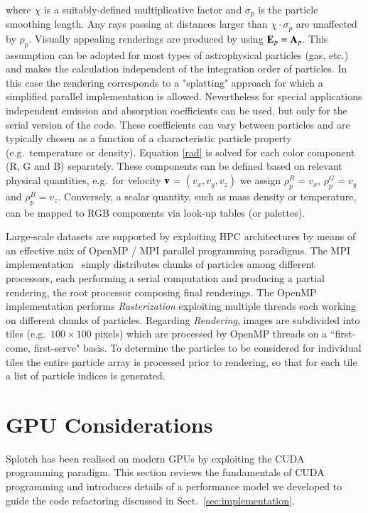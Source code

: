 \documentclass[preprint,5pt]{elsarticle}
\begin{document}
\begin{itemize}
where $\chi$ is a suitably-defined multiplicative factor and $\sigma_p$ is the particle smoothing length. Any rays passing at distances larger than $\chi\cdot\sigma_p$ are unaffected by $\rho_p$. 
Visually appealing renderings are produced by using ${\bf E}_p = {\bf A}_p$. 
This assumption can be adopted for most types of astrophysical particles (gas, etc.) and makes the calculation independent of the integration order of particles. In this case the rendering corresponds to a "splatting" approach for which a simplified parallel implementation is allowed. Nevertheless for special applications independent emission and absorption coefficients can be used, but only for the serial version of the code. These coefficients
can vary between particles and are typically chosen as a function of a characteristic
particle property (e.g.\ temperature or density).
Equation \eqref{rad} is solved for each color component (R, G and B) separately. These components can be defined based on relevant physical quantities, e.g.\ for velocity $\bf v$$=(v_x, v_y, v_z)$ we assign $\rho_p^{R}=v_x$, $\rho_p^{G}=v_y$ and $\rho_p^{B}=v_z$. Conversely, a scalar quantity, such as mass density or temperature, can be mapped to RGB components via look-up tables (or palettes). 
\end{itemize}
Large-scale datasets are supported by exploiting HPC architectures by means of an effective mix of OpenMP / MPI parallel programming paradigms. The MPI implementation~\cite{jin:high-performance}  simply distributes chunks of particles among different processors, each performing a serial computation and producing a partial rendering, the root processor composing final renderings. The OpenMP implementation performs {\it Rasterization} exploiting multiple threads each working on different chunks of particles. Regarding {\it Rendering}, images are subdivided into tiles (e.g.\ $100 \times 100$ pixels) which are processed by OpenMP threads on a ``first-come, first-serve" basis. To determine the particles to be considered for individual tiles the entire particle array is processed prior to rendering, so that for each tile a list of particle indices is generated.


\section{GPU Considerations}
\label{sec:gpu-code}

Splotch has been realised on modern GPUs by exploiting the CUDA programming paradigm. This section reviews the fundamentals of CUDA programming and introduces details of a performance model we developed to guide the code refactoring discussed in Sect.~\ref{sec:implementation}.  
\end{document}
